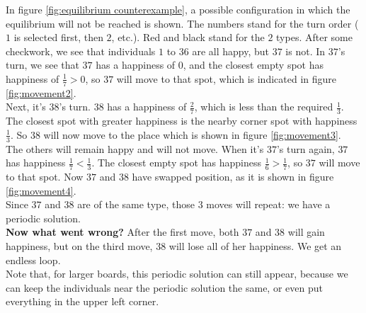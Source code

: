 In figure \ref{fig:equilibrium counterexample}, a possible configuration in which the equilibrium will not be reached is shown. The numbers stand for the turn order ($1$ is selected first, then $2$, etc.). Red and black stand for the $2$ types. After some checkwork, we see that individuals $1$ to $36$ are all happy, but $37$ is not. In $37$'s turn, we see that $37$ has a happiness of $0$, and the closest empty spot has happiness of $\frac{1}{7} > 0$, so $37$ will move to that spot, which is indicated in figure \ref{fig:movement2}.
\\Next, it's $38$'s turn. $38$ has a happiness of $\frac{2}{7}$, which is less than the required $\frac{1}{3}$. The closest spot with greater happiness is the nearby corner spot with happiness $\frac{1}{3}$. So $38$ will now move to the place which is shown in figure \ref{fig:movement3}.\\
The others will remain happy and will not move. When it's $37$'s turn again, $37$ has happiness $\frac{1}{7} < \frac{1}{3}$. The closest empty spot has happiness $\frac{1}{6} > \frac{1}{7}$, so $37$ will move to that spot. Now $37$ and $38$ have swapped position, as it is shown in figure \ref{fig:movement4}.\\
Since $37$ and $38$ are of the same type, those $3$ moves will repeat: we have a periodic solution.\\
\textbf{Now what went wrong?} After the first move, both $37$ and $38$ will gain happiness, but on the third move, $38$ will lose all of her happiness. 
We get an endless loop.\\
Note that, for larger boards, this periodic solution can still appear, because we can keep the individuals near the periodic solution the same, or even put everything in the upper left corner.

